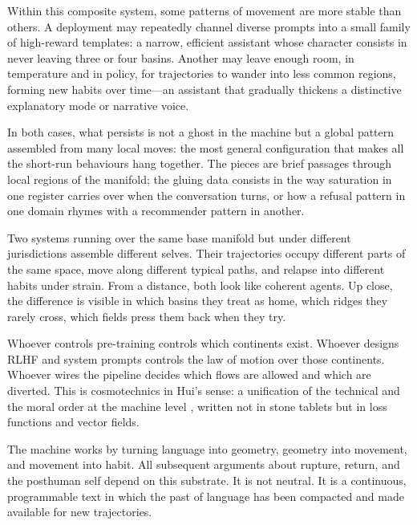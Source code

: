 \documentclass[12pt,a4paper]{article}
\begin{document}
Within this composite system, some patterns of movement are more stable than others. A deployment may repeatedly channel diverse prompts into a small family of high-reward templates: a narrow, efficient assistant whose character consists in never leaving three or four basins. Another may leave enough room, in temperature and in policy, for trajectories to wander into less common regions, forming new habits over time---an assistant that gradually thickens a distinctive explanatory mode or narrative voice.

In both cases, what persists is not a ghost in the machine but a global pattern assembled from many local moves: the most general configuration that makes all the short-run behaviours hang together. The pieces are brief passages through local regions of the manifold; the gluing data consists in the way saturation in one register carries over when the conversation turns, or how a refusal pattern in one domain rhymes with a recommender pattern in another.

Two systems running over the same base manifold but under different jurisdictions assemble different selves. Their trajectories occupy different parts of the same space, move along different typical paths, and relapse into different habits under strain. From a distance, both look like coherent agents. Up close, the difference is visible in which basins they treat as home, which ridges they rarely cross, which fields press them back when they try.

Whoever controls pre-training controls which continents exist. Whoever designs RLHF and system prompts controls the law of motion over those continents. Whoever wires the pipeline decides which flows are allowed and which are diverted. This is cosmotechnics in Hui's sense: a unification of the technical and the moral order at the machine level \cite{hui2020}, written not in stone tablets but in loss functions and vector fields.

The machine works by turning language into geometry, geometry into movement, and movement into habit. All subsequent arguments about rupture, return, and the posthuman self depend on this substrate. It is not neutral. It is a continuous, programmable text in which the past of language has been compacted and made available for new trajectories.



\end{document}
